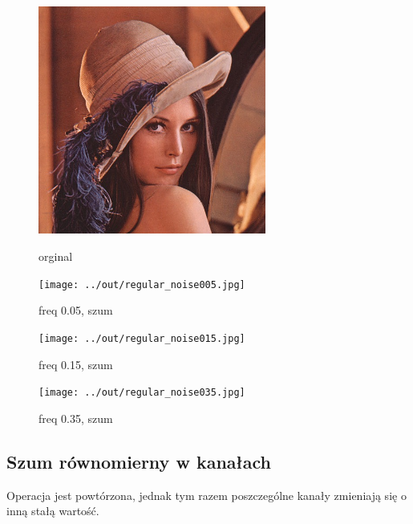 \documentclass[a4paper,12pt]{article}
\begin{document}


\newpage
\begin{figure}[h!]
\begin{minipage}[t]{7.5cm}
\begin{center}
\includegraphics[width=7.5cm,clip]{../../lena.jpg}
\caption{orginal}
\end{center}
\end{minipage}
\hfill
\begin{minipage}[t]{7.5cm}
\begin{center}
\texttt{[image: ../out/regular\_noise005.jpg]}
\caption{freq 0.05, szum \protect}
\end{center}
\end{minipage}
\end{figure}

\begin{figure}[h!]
\begin{minipage}[t]{7.5cm}
\begin{center}
\texttt{[image: ../out/regular\_noise015.jpg]}
\caption{freq 0.15, szum \protect}
\end{center}
\end{minipage}
\hfill
\begin{minipage}[t]{7.5cm}
\begin{center}
\texttt{[image: ../out/regular\_noise035.jpg]}
\caption{freq 0.35, szum \protect}
\end{center}
\end{minipage}
\end{figure}


\newpage
\subsection{Szum równomierny w kanałach}
Operacja jest powtórzona, jednak tym razem poszczególne kanały zmieniają się o inną stałą wartość.
\end{document}

